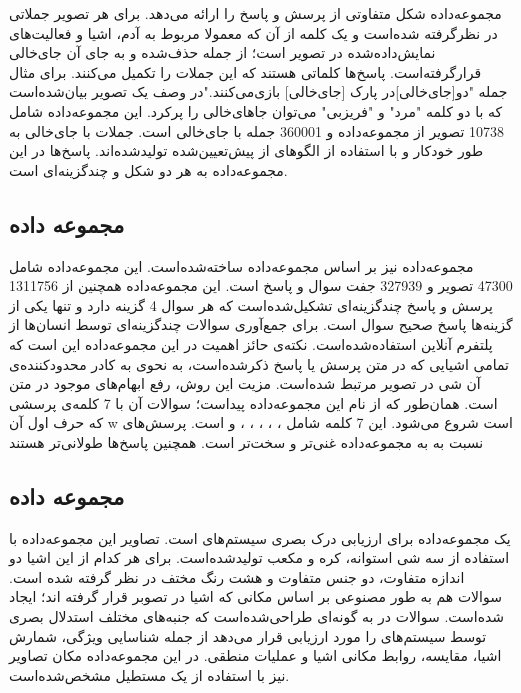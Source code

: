 	مجموعه‌داده 
	شکل متفاوتی از پرسش و پاسخ را ارائه می‌دهد. برای هر تصویر جملاتی در نظرگرفته شده‌است و یک کلمه از آن که معمولا مربوط به آدم، اشیا و  فعالیت‌های نمایش‌داده‌شده در تصویر است؛ از جمله حذف‌شده و به جای آن جای‌خالی قرار‌گرفته‌است. پاسخ‌ها کلماتی هستند که این جملات را تکمیل می‌کنند. برای مثال جمله "دو[جای‌خالی]در پارک [جای‌خالی] بازی‌می‌کنند."در وصف یک تصویر بیان‌شده‌است که با دو کلمه "مرد" و "فریزبی" می‌توان جاهای‌خالی‌ را پرکرد. این مجموعه‌داده شامل 10738 تصویر از مجموعه‌داده 
	\cite{lin2014microsoft}
	 و 360001 جمله با جای‌خالی است. جملات با جای‌خالی به طور خودکار و با استفاده از الگوهای از پیش‌تعیین‌شده تولیدشده‌اند. پاسخ‌ها در این مجموعه‌داده به هر دو شکل 
	و چند‌گزینه‌ای است.

\subsection{مجموعه داده \cite{zhu2016visual7w}}
	مجموعه‌داده
	نیز بر اساس مجموعه‌داده
 \cite{lin2014microsoft}
	  ساخته‌شده‌است. این مجموعه‌داده شامل 47300 تصویر و 327939 جفت سوال و پاسخ است. این مجموعه‌داده همچنین از 1311756 پرسش و پاسخ چند‌گزینه‌ای تشکیل‌شده‌است که هر سوال 4 گزینه دارد و تنها یکی از گزینه‌ها پاسخ صحیح سوال است. برای جمع‌آوری سوالات چندگزینه‌ای توسط انسان‌ها از پلتفرم آنلاین 
  استفاده‌شده‌است. نکته‌ی حائز اهمیت در این ‌مجموعه‌داده این است که تمامی اشیایی که در متن پرسش یا پاسخ ذکر‌شده‌است، به نحوی به کادر محدود‌کننده‌ی آن شی در تصویر مرتبط شده‌است. مزیت این روش، رفع ابهام‌های موجود در متن است.  همان‌طور که از نام این مجموعه‌داده پیداست؛ سوالات آن با 7 کلمه‌ی پرسشی که حرف اول آن w است شروع می‌شود. این 7 کلمه شامل
  ،
  ،
  ،
  ،
  ،
  و
	است. پرسش‌های
	 نسبت به به مجموعه‌داده 
  غنی‌تر و سخت‌تر است. همچنین پاسخ‌ها طولانی‌تر هستند
\subsection{مجموعه داده \cite{johnson2017clevr}}

 یک مجموعه‌داده برای ارزیابی درک بصری سیستم‌های 
  است. تصاویر این مجموعه‌داده با استفاده از سه شی استوانه، کره و مکعب تولیدشده‌است. برای هر کدام از این اشیا دو اندازه متفاوت، دو جنس متفاوت و هشت رنگ مختف در نظر گرفته شده است. سوالات هم به طور مصنوعی بر اساس مکانی که اشیا در تصوبر قرار گرفته اند؛ ایجاد شده‌است. سوالات در
   به گونه‌ای طراحی‌شده‌است که جنبه‌های مختلف استدلال بصری توسط سیستم‌های 
   را مورد ارزیابی قرار می‌دهد از جمله شناسایی ویژگی، شمارش اشیا، مقایسه، روابط مکانی اشیا و عملیات منطقی. در این مجموعه‌داده مکان تصاویر نیز با استفاده از یک مستطیل مشخص‌شده‌است.

